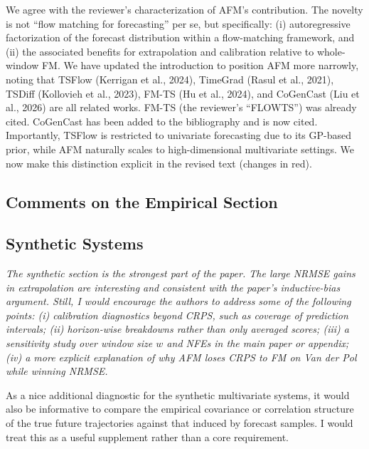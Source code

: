 \documentclass[11pt]{article}
\newcommand{\reviewertext}[1]{%
  \begin{reviewerquote}
    {\color{reviewercolor}\itshape #1}
  \end{reviewerquote}%
}
\newcommand{\authorresponse}[1]{%
    #1\par\medskip
}
\begin{document}
\authorresponse{%
We agree with the reviewer's characterization of AFM's contribution. The novelty is not ``flow matching for forecasting'' per se, but specifically: (i) autoregressive factorization of the forecast distribution within a flow-matching framework, and (ii) the associated benefits for extrapolation and calibration relative to whole-window FM. We have updated the introduction to position AFM more narrowly, noting that TSFlow (Kerrigan et al., 2024), TimeGrad (Rasul et al., 2021), TSDiff (Kollovieh et al., 2023), FM-TS (Hu et al., 2024), and CoGenCast (Liu et al., 2026) are all related works. FM-TS (the reviewer's ``FLOWTS'') was already cited.  CoGenCast has been added to the bibliography and is now cited. Importantly, TSFlow is restricted to univariate forecasting due to its GP-based prior, while AFM naturally scales to high-dimensional multivariate settings. We now make this distinction explicit in the revised text (changes in red).
}

\subsection{Comments on the Empirical Section}

\subsection{Synthetic Systems}

\reviewertext{%
The synthetic section is the strongest part of the paper. The large NRMSE gains in extrapolation are interesting and consistent with the paper's inductive-bias argument. Still, I would encourage the authors to address some of the following points: (i) calibration diagnostics beyond CRPS, such as coverage of prediction intervals; (ii) horizon-wise breakdowns rather than only averaged scores; (iii) a sensitivity study over window size $w$ and NFEs in the main paper or appendix; (iv) a more explicit explanation of why AFM loses CRPS to FM on Van der Pol while winning NRMSE.

As a nice additional diagnostic for the synthetic multivariate systems, it would also be informative to compare the empirical covariance or correlation structure of the true future trajectories against that induced by forecast samples. I would treat this as a useful supplement rather than a core requirement.
}
\end{document}

